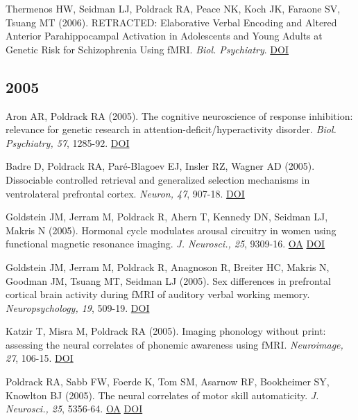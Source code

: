 Thermenos HW, Seidman LJ, Poldrack RA, Peace NK, Koch JK, Faraone SV, Tsuang MT (2006). RETRACTED: Elaborative Verbal Encoding and Altered Anterior Parahippocampal Activation in Adolescents and Young Adults at Genetic Risk for Schizophrenia Using fMRI. \textit{Biol. Psychiatry}. \href{http://dx.doi.org/10.1016/j.biopsych.2006.04.032}{DOI} \vspace{2mm}

\subsection*{2005}

Aron AR, Poldrack RA (2005). The cognitive neuroscience of response inhibition: relevance for genetic research in attention-deficit/hyperactivity disorder. \textit{Biol. Psychiatry, 57}, 1285-92. \href{http://dx.doi.org/10.1016/j.biopsych.2004.10.026}{DOI} \vspace{2mm}

Badre D, Poldrack RA, Paré-Blagoev EJ, Insler RZ, Wagner AD (2005). Dissociable controlled retrieval and generalized selection mechanisms in ventrolateral prefrontal cortex. \textit{Neuron, 47}, 907-18. \href{http://dx.doi.org/10.1016/j.neuron.2005.07.023}{DOI} \vspace{2mm}

Goldstein JM, Jerram M, Poldrack R, Ahern T, Kennedy DN, Seidman LJ, Makris N (2005). Hormonal cycle modulates arousal circuitry in women using functional magnetic resonance imaging. \textit{J. Neurosci., 25}, 9309-16. \href{https://www.ncbi.nlm.nih.gov/pmc/articles/PMC6725775}{OA} \href{http://dx.doi.org/10.1523/jneurosci.2239-05.2005}{DOI} \vspace{2mm}

Goldstein JM, Jerram M, Poldrack R, Anagnoson R, Breiter HC, Makris N, Goodman JM, Tsuang MT, Seidman LJ (2005). Sex differences in prefrontal cortical brain activity during fMRI of auditory verbal working memory. \textit{Neuropsychology, 19}, 509-19. \href{http://dx.doi.org/10.1037/0894-4105.19.4.509}{DOI} \vspace{2mm}

Katzir T, Misra M, Poldrack RA (2005). Imaging phonology without print: assessing the neural correlates of phonemic awareness using fMRI. \textit{Neuroimage, 27}, 106-15. \href{http://dx.doi.org/10.1016/j.neuroimage.2005.04.013}{DOI} \vspace{2mm}

Poldrack RA, Sabb FW, Foerde K, Tom SM, Asarnow RF, Bookheimer SY, Knowlton BJ (2005). The neural correlates of motor skill automaticity. \textit{J. Neurosci., 25}, 5356-64. \href{https://www.ncbi.nlm.nih.gov/pmc/articles/PMC6725010}{OA} \href{http://dx.doi.org/10.1523/jneurosci.3880-04.2005}{DOI} \vspace{2mm}

